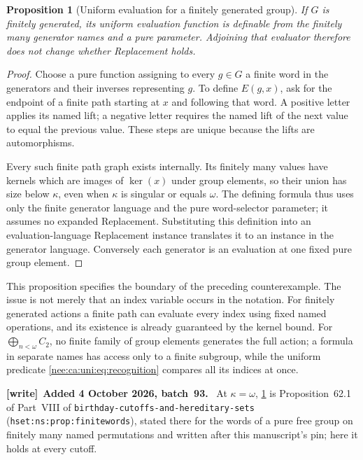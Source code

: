 \documentclass[11pt,letterpaper]{article}
\numberwithin{equation}{section}
\theoremstyle{plain}
\newtheorem{proposition}[proposition]{Proposition}
\theoremstyle{definition}
\theoremstyle{remark}
\newcommand{\kerat}{\operatorname{ker}}
\newenvironment{writenote}[1][]{\par\smallskip\begingroup\small\raggedright
 \setlength{\parindent}{1.25em}\noindent\textbf{[write]}\if\relax\detokenize{#1}\relax\else~\textbf{#1.}\fi\ }%
 {\par\endgroup\smallskip}
\begin{document}
\begin{proposition}[Uniform evaluation for a finitely generated group]
\label{nee:ca:uni:fg}
If $G$ is finitely generated, its uniform evaluation function is definable
from the finitely many generator names and a pure parameter.  Adjoining
that evaluator therefore does not change whether Replacement holds.
\end{proposition}
\begin{proof}
Choose a pure function assigning to every $g\in G$ a finite word in the
generators and their inverses representing $g$.  To define $E(g,x)$,
ask for the endpoint of a finite path starting at $x$ and following
that word.  A positive letter applies its named lift; a negative
letter requires the named lift of the next value to equal the previous
value.  These steps are unique because the lifts are automorphisms.

Every such finite path graph exists internally.  Its finitely many
values have kernels which are images of $\kerat(x)$ under group elements,
so their union has size below $\kappa$, even when $\kappa$ is singular
or equals $\omega$.  The defining formula thus uses only the finite
generator language and the pure word-selector parameter; it assumes
no expanded Replacement.  Substituting this definition into an
evaluation-language Replacement instance translates it to an instance
in the generator language.  Conversely each generator is an evaluation
at one fixed pure group element.
\end{proof}

This proposition specifies the boundary of the preceding counterexample.
The issue is not merely that an index variable occurs in the notation.
For finitely generated actions a finite path can evaluate every index
using fixed named operations, and its existence is already guaranteed
by the kernel bound.  For $\bigoplus_{n<\omega}C_2$, no finite family of
group elements generates the full action; a formula in separate names
has access only to a finite subgroup, while the uniform predicate
\eqref{nee:ca:uni:eq:recognition} compares all its indices at once.

\begin{writenote}[Added 4 October 2026, batch~93]
At $\kappa=\omega$, \cref{nee:ca:uni:fg} is Proposition~62.1 of Part~VIII of \nolinkurl{birthday-cutoffs-and-hereditary-sets} (\texttt{hset:ns:prop:finitewords}), stated there for the words of a pure free group on finitely many named permutations and written after this manuscript's pin; here it holds at every cutoff.
\end{writenote}
\end{document}
